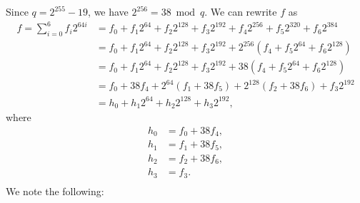\documentclass[a4paper, 12pt]{article}
\begin{document}
Since $q = 2^{255}-19$, we have $2^{256} = 38 \bmod q$. We can rewrite $f$ as
\begin{align*}
  f  = \sum^{6}_{i=0} f_i 2^{64i} &= f_0 + f_1 2^{64} + f_2 2^{128} + f_3 2^{192} + f_4 2^{256} +   f_5 2^{320} + f_6 2^{384}\\
   &= f_0 + f_1 2^{64} + f_2 2^{128} + f_3 2^{192} + 2^{256} \left(  f_4 +   f_5 2^{64} + f_6 2^{128} \right)\\
   &= f_0 + f_1 2^{64} + f_2 2^{128} + f_3 2^{192} + 38 \left(  f_4 +   f_5 2^{64} + f_6 2^{128} \right)\\
   &= f_0 + 38 f_4 + 2^{64} \left( f_1 + 38f_5 \right)+ 2^{128} \left(  f_2 + 38 f_6\right) + f_3 2^{192}\\
   & = h_0 + h_1 2^{64} + h_2 2^{128} + h_3 2^{192},
\end{align*}
where
\begin{align*}
  h_0 & = f_0 + 38 f_4,\\
  h_1 & = f_1 + 38 f_5,\\
  h_2 & = f_2 + 38 f_6,\\
  h_3 & = f_3.\\
\end{align*}
We note the following:
\end{document}
